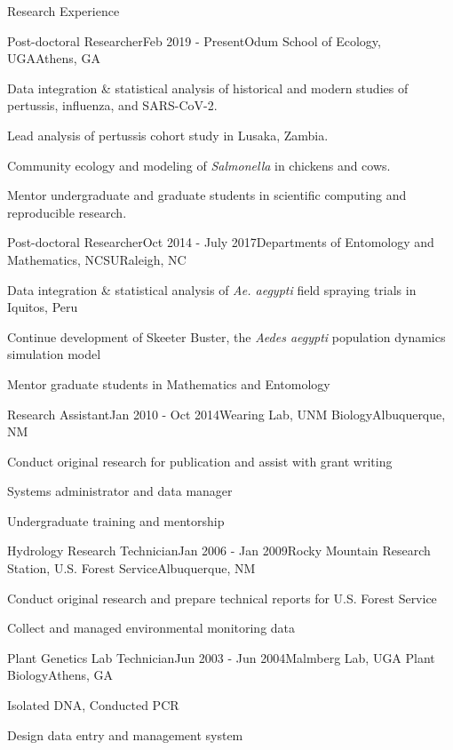 \documentclass{resume} %
\begin{document}
\begin{rSection}{Research Experience}

\begin{rSubsection}{Post-doctoral Researcher}{Feb 2019 - Present}{Odum School of
Ecology, UGA}{Athens, GA}
\item Data integration \& statistical analysis of historical and modern studies of pertussis, influenza, and SARS-CoV-2.
\item Lead analysis of pertussis cohort study in Lusaka, Zambia.
\item Community ecology and modeling of \textit{Salmonella} in chickens and cows.
\item Mentor undergraduate and graduate students in scientific computing and reproducible research.
\end{rSubsection}

\begin{rSubsection}{Post-doctoral Researcher}{Oct 2014 - July 2017}{Departments of
Entomology and Mathematics, NCSU}{Raleigh, NC}
\item Data integration \& statistical analysis of {\em Ae. aegypti} field spraying trials in Iquitos, Peru
\item Continue development of Skeeter Buster, the {\em Aedes aegypti} population dynamics simulation model
\item Mentor graduate students in Mathematics and Entomology
\end{rSubsection}

\begin{rSubsection}{Research Assistant}{Jan 2010 - Oct 2014}{Wearing Lab, UNM Biology}{Albuquerque, NM}
\item Conduct original research for publication and assist with grant writing
\item Systems administrator and data manager
\item Undergraduate training and mentorship
\end{rSubsection}

\begin{rSubsection}{Hydrology Research Technician}{Jan 2006 - Jan 2009}{Rocky
Mountain Research Station, U.S. Forest Service}{Albuquerque, NM}
\item Conduct original research and prepare technical reports for U.S. Forest Service
\item Collect and managed environmental monitoring data 
\end{rSubsection}

\begin{rSubsection}{Plant Genetics Lab Technician}{Jun 2003 - Jun 2004}{Malmberg Lab, UGA Plant Biology}{Athens, GA}
\item Isolated DNA, Conducted PCR
\item Design data entry and management system
\end{rSubsection}


\end{rSection}
\end{document}
